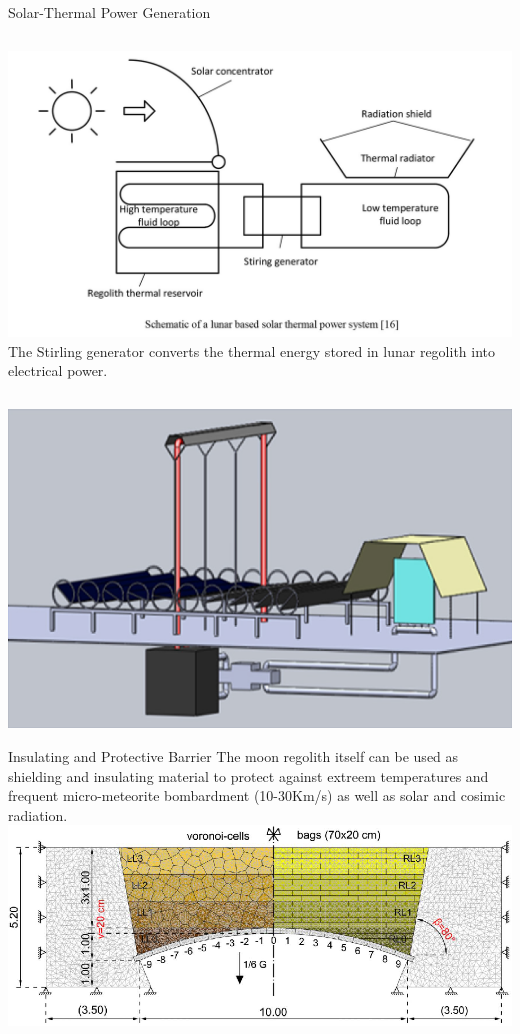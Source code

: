 \documentclass{beamer}
\begin{document}
\begin{frame}{Solar-Thermal Power Generation}
       \begin{columns}
             \centering
             \includegraphics[width= \textwidth]{Solar_thermal.jpg}
              The Stirling generator converts the
thermal energy stored in lunar regolith into electrical power.\cite{Yao}\cite{Climent}
         \end{columns} 
         \center
         \includegraphics[width= .5\textwidth]{Heat_night.eps}
    \end{frame}



\begin{frame}{Insulating and Protective Barrier }
The moon regolith itself can be used as shielding and insulating material to protect against extreem temperatures and frequent micro-meteorite bombardment (10-30Km/s) as well as solar and cosimic radiation.
\cite{Toth}
\center
\includegraphics[width= .95\textwidth]{bags.eps}   
\end{frame}
\end{document}
